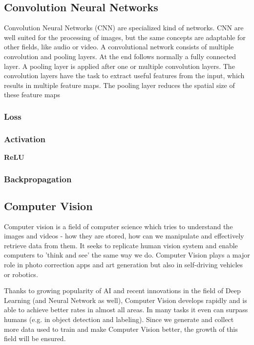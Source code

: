 \documentclass[../Main.tex]{subfiles}
\begin{document}
    \subsection{Convolution Neural Networks}
        Convolution Neural Networks (CNN) are specialized kind of networks. CNN are well suited for the processing of images, but the same concepts are adaptable for other fields, like audio or video. A convolutional network consists of multiple convolution and pooling layers. At the end follows normally a fully connected layer. A pooling layer is applied after one or multiple convolution layers. The convolution layers have the task to extract useful features from the input, which results in multiple feature maps. The pooling layer reduces the spatial size of these feature maps
            
    \subsubsection{Loss}
    \subsubsection{Activation}
        \textbf{ReLU}
    \subsubsection{Backpropagation}


\subsection{Computer Vision}
    Computer vision is a field of computer science which tries to understand the images and videos - how they are stored, how can we manipulate and effectively retrieve data from them. It seeks to replicate human vision system and enable computers to 'think and see' the same way we do.  Computer Vision plays a major role in photo correction apps and art generation but also in self-driving vehicles or robotics.
    
    Thanks to growing popularity of AI and recent innovations in the field of Deep Learning (and Neural Network as well), Computer Vision develops rapidly and is able to achieve better rates in almost all areas. In many tasks it even can surpass humans (e.g. in object detection and labeling). Since we generate and collect more data used to train and make Computer Vision better, the growth of this field will be ensured.
\end{document}
